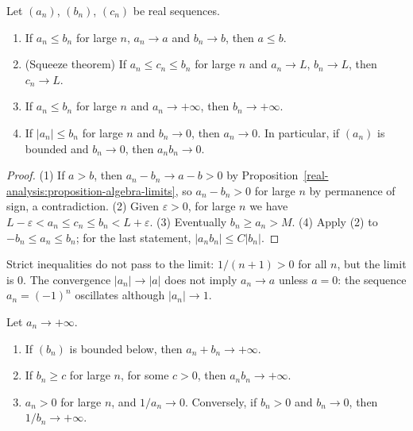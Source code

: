 \begin{proposition}\label{real-analysis:proposition-squeeze}
Let $(a_n)$, $(b_n)$, $(c_n)$ be real sequences.
\begin{enumerate}
\item If $a_n \leq b_n$ for large $n$, $a_n \to a$ and $b_n \to b$, then $a \leq b$.
\item (Squeeze theorem) If $a_n \leq c_n \leq b_n$ for large $n$ and $a_n \to L$, $b_n \to L$, then $c_n \to L$.
\item If $a_n \leq b_n$ for large $n$ and $a_n \to +\infty$, then $b_n \to +\infty$.
\item If $|a_n| \leq b_n$ for large $n$ and $b_n \to 0$, then $a_n \to 0$. In particular, if $(a_n)$ is bounded and $b_n \to 0$, then $a_nb_n \to 0$.
\end{enumerate}
\end{proposition}

\begin{proof}
(1) If $a > b$, then $a_n - b_n \to a - b > 0$ by Proposition~\ref{real-analysis:proposition-algebra-limits}, so $a_n - b_n > 0$ for large $n$ by permanence of sign, a contradiction.
(2) Given $\varepsilon > 0$, for large $n$ we have $L - \varepsilon < a_n \leq c_n \leq b_n < L + \varepsilon$. (3) Eventually $b_n \geq a_n > M$. (4) Apply (2) to $-b_n \leq a_n \leq b_n$; for the last
statement, $|a_nb_n| \leq C|b_n|$.
\end{proof}

\begin{counterexample}\label{real-analysis:counterexample-strict-inequality}
Strict inequalities do not pass to the limit: $1/(n + 1) > 0$ for all $n$, but the limit is $0$. The convergence $|a_n| \to |a|$ does not imply $a_n \to a$ unless $a = 0$: the sequence $a_n = (-1)^n$
oscillates although $|a_n| \to 1$.
\end{counterexample}

\begin{proposition}\label{real-analysis:proposition-infinite-limits}
Let $a_n \to +\infty$.
\begin{enumerate}
\item If $(b_n)$ is bounded below, then $a_n + b_n \to +\infty$.
\item If $b_n \geq c$ for large $n$, for some $c > 0$, then $a_nb_n \to +\infty$.
\item $a_n > 0$ for large $n$, and $1/a_n \to 0$. Conversely, if $b_n > 0$ and $b_n \to 0$, then $1/b_n \to +\infty$.
\end{enumerate}
\end{proposition}

